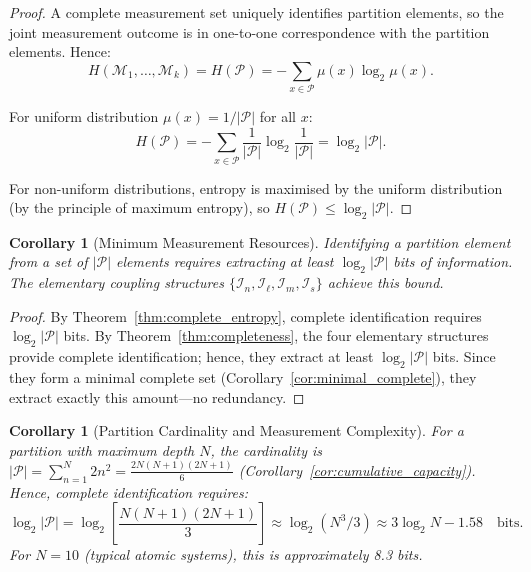 \documentclass[twocolumn,10pt,a4paper]{article}
\newtheorem{corollary}[theorem]{Corollary}
\theoremstyle{remark}
\newcommand{\partition}{\mathcal{P}}
\begin{document}
\begin{proof}
A complete measurement set uniquely identifies partition elements, so the joint measurement outcome is in one-to-one correspondence with the partition elements. Hence:
\begin{equation}
H(\mathcal{M}_1, \ldots, \mathcal{M}_k) = H(\partition) = -\sum_{x \in \partition} \mu(x) \log_2 \mu(x).
\end{equation}

For uniform distribution $\mu(x) = 1/|\partition|$ for all $x$:
\begin{equation}
H(\partition) = -\sum_{x \in \partition} \frac{1}{|\partition|} \log_2 \frac{1}{|\partition|} = \log_2 |\partition|.
\end{equation}

For non-uniform distributions, entropy is maximised by the uniform distribution (by the principle of maximum entropy), so $H(\partition) \leq \log_2 |\partition|$.
\end{proof}

\begin{corollary}[Minimum Measurement Resources]
\label{cor:min_resources}
Identifying a partition element from a set of $|\partition|$ elements requires extracting at least $\log_2 |\partition|$ bits of information. The elementary coupling structures $\{\mathcal{I}_n, \mathcal{I}_\ell, \mathcal{I}_m, \mathcal{I}_s\}$ achieve this bound.
\end{corollary}

\begin{proof}
By Theorem~\ref{thm:complete_entropy}, complete identification requires $\log_2 |\partition|$ bits. By Theorem~\ref{thm:completeness}, the four elementary structures provide complete identification; hence, they extract at least $\log_2 |\partition|$ bits. Since they form a minimal complete set (Corollary~\ref{cor:minimal_complete}), they extract exactly this amount—no redundancy.
\end{proof}

\begin{corollary}[Partition Cardinality and Measurement Complexity]
\label{cor:partition_cardinality}
For a partition with maximum depth $N$, the cardinality is $|\partition| = \sum_{n=1}^N 2n^2 = \frac{2N(N+1)(2N+1)}{6}$ (Corollary~\ref{cor:cumulative_capacity}). Hence, complete identification requires:
\begin{equation}
\log_2 |\partition| = \log_2 \left[\frac{N(N+1)(2N+1)}{3}\right] \approx \log_2(N^3/3) \approx 3\log_2 N - 1.58 \quad \text{bits}.
\end{equation}
For $N = 10$ (typical atomic systems), this is approximately 8.3 bits.
\end{corollary}
\end{document}
